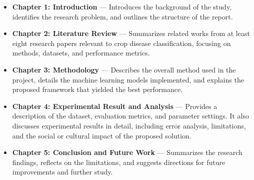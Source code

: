 \begin{itemize}
    \item \textbf{Chapter 1: Introduction} — Introduces the background of the study, identifies the research problem, and outlines the structure of the report.
    
    \item \textbf{Chapter 2: Literature Review} — Summarizes related works from at least eight research papers relevant to crop disease classification, focusing on methods, datasets, and performance metrics.

    \item \textbf{Chapter 3: Methodology} — Describes the overall method used in the project, details the machine learning models implemented, and explains the proposed framework that yielded the best performance.

    \item \textbf{Chapter 4: Experimental Result and Analysis} — Provides a description of the dataset, evaluation metrics, and parameter settings. It also discusses experimental results in detail, including error analysis, limitations, and the social or cultural impact of the proposed solution.

    \item \textbf{Chapter 5: Conclusion and Future Work} — Summarizes the research findings, reflects on the limitations, and suggests directions for future improvements and further study.
\end{itemize}

